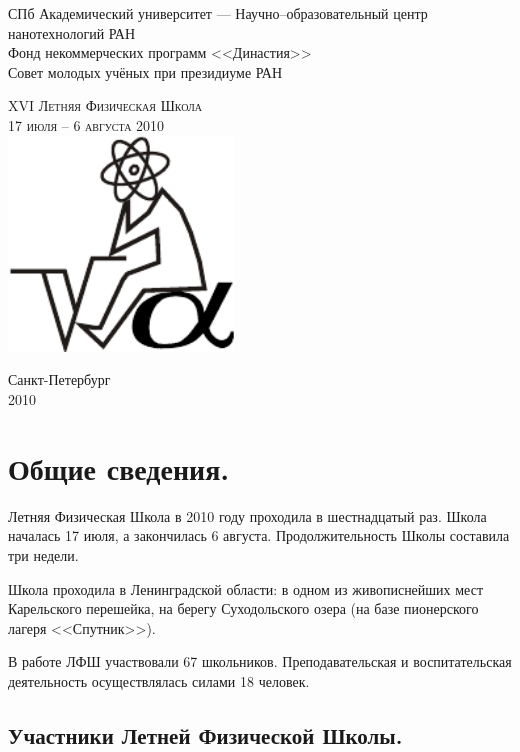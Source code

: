 \documentclass[12pt,a4paper,oneside]{scrartcl}
\newlength{\h}
\newlength{\x}
\begin{document}
\parindent=5mm
\begin{center}
  \small{\textsf{СПб Академический университет ---
      Научно--образовательный центр нанотехнологий РАН\\
    Фонд некоммерческих программ <<Династия>>\\
  Совет молодых учёных при президиуме РАН}}

\vfill
\LARGE{\textsc{XVI Летняя Физическая Школа}}\\
\Large{\textsc{17 июля -- 6 августа 2010}}\\[2cm]
\includegraphics[width=6cm]{logo.pdf}
\vfill

\small{\textsf{Санкт-Петербург}\\
\textsf{2010}}
\end{center}

\clearpage

\tableofcontents

\clearpage

\section{Общие сведения.}
\label{sec:general}

Летняя Физическая Школа в 2010 году проходила в шестнадцатый
раз. Школа началась 17 июля, а закончилась 6
августа. Продолжительность Школы составила три недели.

Школа проходила в Ленинградской области: в одном из живописнейших мест
Карельского перешейка, на берегу Суходольского озера (на базе
пионерского лагеря <<Спутник>>).

В работе ЛФШ участвовали 67 школьников. Преподавательская и воспитательская
деятельность осуществлялась силами 18 человек.

\subsection{Участники Летней Физической Школы. }
\label{sec:scholars}
\end{document}
